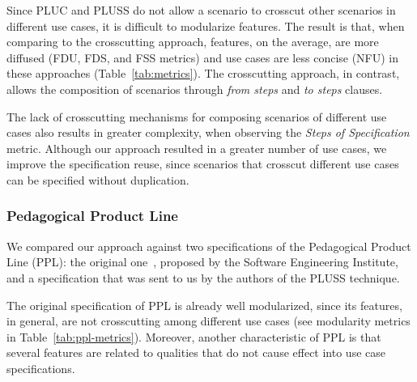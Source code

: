 \documentclass{report}
\begin{document}
\begin{frontmatter}
{Since PLUC and PLUSS do not allow a
scenario to crosscut other scenarios in different use cases, it
is difficult to modularize features. The
result is that, when comparing to the crosscutting approach,
features, on the average,  are more 
diffused (FDU, FDS, and FSS metrics) and use cases are
less concise (NFU) in these approaches (Table~\ref{tab:metrics}). The crosscutting
approach, in contrast, allows the composition of scenarios
through \emph{from steps} and \emph{to steps} clauses. 

The lack of crosscutting mechanisms for composing scenarios of different use cases also results in greater complexity, when observing the \emph{Steps of Specification} metric. Although our approach resulted in a greater number of use cases, we improve the specification reuse, since scenarios that crosscut different use cases can be specified without duplication. 


\subsubsection{Pedagogical Product Line}

We compared our approach against two specifications of the Pedagogical Product Line (PPL): the original one~\cite{ppl-url}, proposed by the Software Engineering Institute, and a specification that was sent to us by the authors of the PLUSS technique. 

The original specification of PPL is already well modularized, since its features, in general, are not crosscutting among different use cases (see modularity metrics in Table~\ref{tab:ppl-metrics}). Moreover, another characteristic of PPL is that several features are related to qualities that do not cause effect into use case specifications. 

}
\end{frontmatter}
\end{document}
